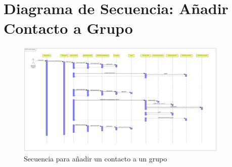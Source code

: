 \section*{Diagrama de Secuencia: Añadir Contacto a Grupo}

\begin{figure}[H]
    \centering
    \includegraphics[width=0.9\textwidth]{images/addUserToGroupSequence.png}
    \caption{Secuencia para añadir un contacto a un grupo}
\end{figure}
